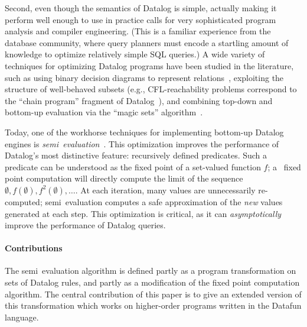 Second, even though the semantics of Datalog is simple, actually
making it perform well enough to use in practice calls for very
sophisticated program analysis and compiler engineering. (This is a
familiar experience from the database community, where query planners
must encode a startling amount of knowledge to optimize relatively
simple SQL queries.) A wide variety of techniques for optimizing
Datalog programs have been studied in the literature, such as using
binary decision diagrams to represent relations~\cite{whaley-phd},
exploiting the structure of well-behaved subsets (e.g.,
CFL-reachability problems correspond to the ``chain program'' fragment
of Datalog~\cite{chain-programs}), and combining top-down and
bottom-up evaluation via the ``magic sets''
algorithm~\cite{magic-sets}.

Today, one of the workhorse techniques for implementing bottom-up
Datalog engines is \emph{semi\naive\
  evaluation}~\cite{seminaive}. This optimization improves the
performance of Datalog's most distinctive feature: recursively defined
predicates. Such a predicate can be understood as the fixed point of a
set-valued function $f$; a \naive\ fixed point computation will
directly compute the limit of the sequence
$\emptyset, f(\emptyset), f^2(\emptyset), \dots$. At each iteration,
many values are unnecessarily re-computed; semi\naive\ evaluation
computes a safe approximation of the \emph{new} values generated at
each step. This optimization is critical, as it can
\emph{asymptotically} improve the performance of Datalog queries.


\paragraph{Contributions} The semi\naive\ evaluation algorithm is
defined partly as a program transformation on sets of Datalog rules,
and partly as a modification of the fixed point computation algorithm.
The central contribution of this paper is to give an extended version
of this transformation which works on higher-order programs written
in the Datafun language. 

